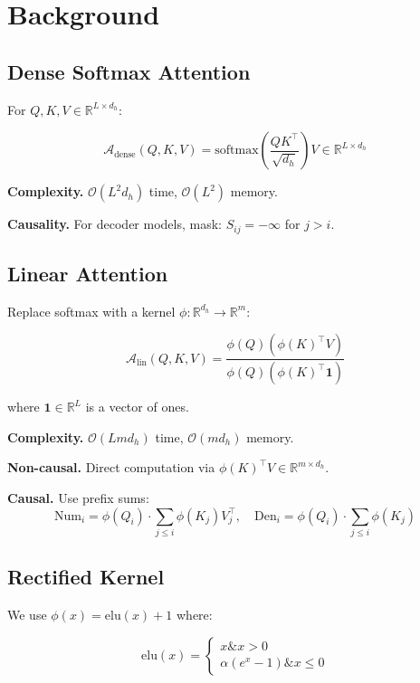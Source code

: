 
\section{Background}

\subsection{Dense Softmax Attention}

For $Q, K, V \in \mathbb{R}^{L \times d_h}$:

\[
\mathcal{A}_\text{dense}(Q, K, V) = \text{softmax}\!\left(\frac{Q K^\top}{\sqrt{d_h}}\right) V \in \mathbb{R}^{L \times d_h}
\]

\textbf{Complexity.} $\mathcal{O}(L^2 d_h)$ time, $\mathcal{O}(L^2)$ memory.

\textbf{Causality.} For decoder models, mask: $S_{ij} = -\infty$ for $j > i$.

\subsection{Linear Attention}

Replace softmax with a kernel $\phi: \mathbb{R}^{d_h} \to \mathbb{R}^m$:

\[
\mathcal{A}_\text{lin}(Q, K, V) = \frac{\phi(Q) \left(\phi(K)^\top V\right)}{\phi(Q) \left(\phi(K)^\top \mathbf{1}\right)}
\]

where $\mathbf{1} \in \mathbb{R}^L$ is a vector of ones.

\textbf{Complexity.} $\mathcal{O}(L m d_h)$ time, $\mathcal{O}(m d_h)$ memory.

\textbf{Non-causal.} Direct computation via $\phi(K)^\top V \in \mathbb{R}^{m \times d_h}$.

\textbf{Causal.} Use prefix sums:
\[
\text{Num}_i = \phi(Q_i) \cdot \sum_{j \le i} \phi(K_j) V_j^\top, \quad
\text{Den}_i = \phi(Q_i) \cdot \sum_{j \le i} \phi(K_j)
\]

\subsection{Rectified Kernel}

We use $\phi(x) = \mathrm{elu}(x) + 1$ where:

\[
\mathrm{elu}(x) = \begin{cases} x \& x > 0 \\ \alpha (e^x - 1) \& x \leq 0 \end{cases}
\]

